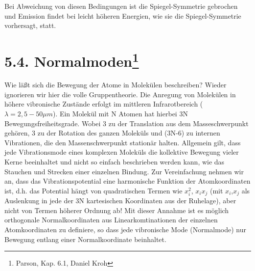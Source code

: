 Bei Abweichung von diesen Bedingungen ist die Spiegel-Symmetrie gebrochen und Emission findet bei leicht höheren Energien, wie sie die Spiegel-Symmetrie vorhersagt, statt.



\section{5.4. Normalmoden\protect\footnote{Parson, Kap. 6.1, Daniel Kroh}\hfill *} 
Wie läßt sich die Bewegung der Atome in Molekülen
beschreiben?  Wieder ignorieren wir hier die volle
Gruppentheorie. \newline
Die Anregung von Molekülen in höhere vibronische Zustände erfolgt im mittleren Infrarotbereich ($\lambda = 2,5-50 \mu m$). Ein Molekül mit N Atomen hat hierbei 3N Bewegungsfreiheitsgrade. Wobei 3 zu der Translation aus dem Masseschwerpunkt gehören, 3 zu der Rotation des ganzen Moleküls und (3N-6) zu internen Vibrationen, die den Massenschwerpunkt stationär halten. Allgemein gilt, dass jede Vibrationsmode eines komplexen Moleküls die kollektive Bewegung vieler Kerne beeinhaltet und nicht so einfach beschrieben werden kann, wie das Stauchen und Strecken einer einzelnen Bindung. Zur Vereinfachung nehmen wir an, dass das Vibrationspotential eine harmonische Funktion der Atomkoordinaten ist, d.h. das Potential hängt von quadratischen Termen wie $x_i^2$, $x_ix_j$ (mit $x_i$,$x_j$ als Auslenkung in jede der 3N kartesischen Koordinaten aus der Ruhelage), aber nicht von Termen höherer Ordnung ab! Mit dieser Annahme ist es möglich orthogonale Normalkoordinaten aus Linearkomtinationen der einzelnen Atomkoordinaten zu definiere, so dass jede vibronische Mode (Normalmode) nur Bewegung entlang einer Normalkoordinate beinhaltet.\\

